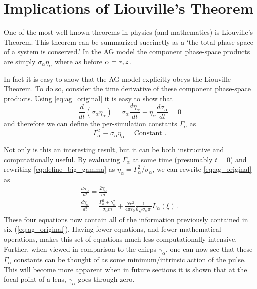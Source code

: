 
\section{Implications of Liouville's Theorem} \label{sec:liouville}

One of the most well known theorems in physics (and mathematics) is Liouville's Theorem.
This theorem can be summarized succinctly as a `the total phase space of a system is conserved.'
In the AG model the component phase-space products are simply $\sigma_{\alpha} \eta_{\alpha}$ where as before $ \alpha = {\scriptscriptstyle T}, z$.

In fact it is easy to show that the AG model explicitly obeys the Liouville Theorem.
To do so, consider the time derivative of these component phase-space products.
Using \ref{eq:ag_original} it is easy to show that
\begin{equation}
  \frac{d}{dt} (\sigma_{\alpha} \eta_{\alpha}) = \sigma_{\alpha} \frac{d \eta_{\alpha}}{dt} + \eta_{\alpha} \frac{d \sigma_{\alpha}}{dt} = 0
\end{equation}
and therefore we can define the per-simulation constants $\Gamma_{\alpha}$ as
\begin{equation} \label{eq:define_big_gamma}
  \Gamma_{\alpha}^2 \equiv \sigma_{\alpha} \eta_{\alpha} = \text{Constant .}
\end{equation}

Not only is this an interesting result, but it can be both instructive and computationally useful.
By evaluating $\Gamma_{\alpha}$ at some time (presumably $t=0$) and rewriting \ref{eq:define_big_gamma} as $\eta_{\alpha} = \Gamma_{\alpha}^2 / \sigma_{\alpha}$, we can rewrite \ref{eq:ag_original} as 
\begin{subequations} \label{eq:ag_big_gamma}
\begin{gather}
  \frac{d\sigma_{\alpha}}{dt} = \frac{2\gamma_{\alpha}}{m} \\
  \frac{d\gamma_{\alpha}}{dt} = \frac{ \Gamma_{\alpha}^2 + \gamma_{\alpha}^2 }{\sigma_{\alpha} m}
    + \frac{N e^2}{4\pi\varepsilon_0} \frac{1}{6 \sqrt{\sigma_{\alpha}\pi}} L_{\alpha}(\xi) \, \text{.} \label{eq:ag_big_gamma_gamma}
\end{gather}
\end{subequations}
These four equations now contain all of the information previously contained in six (\ref{eq:ag_original}).
Having fewer equations, and fewer mathematical operations, makes this set of equations much less computationally intensive.
Further, when viewed in comparison to the chirps $\gamma_{\alpha}$, one can now see that these $\Gamma_{\alpha}$ constants can be thought of as some minimum/intrinsic action of the pulse.
This will become more apparent when in future sections
it is shown that at the focal point of a lens, $\gamma_{\alpha}$ goes through zero.

